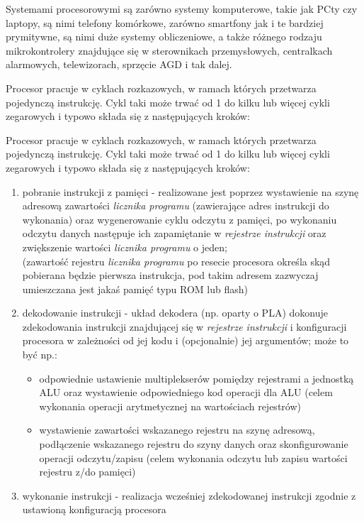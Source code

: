 Systemami procesorowymi są zarówno systemy komputerowe, takie jak PCty czy laptopy, są nimi telefony komórkowe, zarówno smartfony jak i te bardziej prymitywne, są nimi duże systemy obliczeniowe, a także różnego rodzaju mikrokontrolery znajdujące się w sterownikach przemysłowych, centralkach alarmowych, telewizorach, sprzęcie AGD i tak dalej.

Procesor pracuje w cyklach rozkazowych, w ramach których przetwarza pojedynczą instrukcję. Cykl taki może trwać od 1 do kilku lub więcej cykli zegarowych i typowo składa się z następujących kroków:

Procesor pracuje w cyklach rozkazowych, w ramach których przetwarza pojedynczą instrukcję. Cykl taki może trwać od 1 do kilku lub więcej cykli zegarowych i typowo składa się z następujących kroków:
\begin{enumerate}
	\item pobranie instrukcji z pamięci - realizowane jest poprzez wystawienie na szynę adresową zawartości \emph{licznika programu} (zawierające adres instrukcji do wykonania) oraz wygenerowanie cyklu odczytu z pamięci, po wykonaniu odczytu danych następuje ich zapamiętanie w \emph{rejestrze instrukcji} oraz zwiększenie wartości \emph{licznika programu} o jeden;\\
		(zawartość rejestru \emph{licznika programu} po resecie procesora określa skąd pobierana będzie pierwsza instrukcja, pod takim adresem zazwyczaj umieszczana jest jakaś pamięć typu ROM lub flash)
	\item dekodowanie instrukcji - układ dekodera (np. oparty o PLA) dokonuje zdekodowania instrukcji znajdującej się w \emph{rejestrze instrukcji} i konfiguracji procesora w zależności od jej kodu i (opcjonalnie) jej argumentów; może to być np.:
	\begin{itemize}
		\item odpowiednie ustawienie multiplekserów pomiędzy rejestrami a jednostką ALU oraz wystawienie odpowiedniego kod operacji dla ALU (celem wykonania operacji arytmetycznej na wartościach rejestrów)
		\item wystawienie zawartości wskazanego rejestru na szynę adresową, podłączenie wskazanego rejestru do szyny danych oraz skonfigurowanie operacji odczytu/zapisu (celem wykonania odczytu lub zapisu wartości rejestru z/do pamięci)
	\end{itemize}
	\item wykonanie instrukcji - realizacja wcześniej zdekodowanej instrukcji zgodnie z ustawioną konfiguracją procesora
\end{enumerate}

